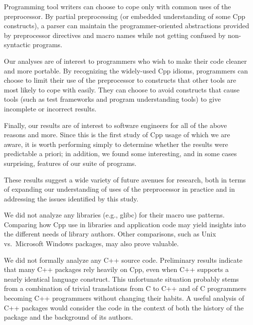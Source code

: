 \documentclass[10pt]{article}
\newcommand{\pkg}[1]{\textsf{#1}}
\begin{document}

Programming tool writers can choose to cope only with common uses of the
preprocessor.  By partial preprocessing (or embedded understanding of
some Cpp constructs), a parser can maintain the
programmer-oriented abstractions provided by preprocessor directives and
macro names while not getting confused by non-syntactic programs.

Our analyses are of interest to programmers who wish to make their code
cleaner and more portable.  By recognizing the widely-used Cpp idioms,
programmers can choose to limit their use of the preprocessor to
constructs that other tools are most likely to cope with easily.  They
can choose to avoid constructs that cause tools (such as test frameworks
and program understanding tools) to give incomplete or incorrect
results.


Finally, our results are of interest to software engineers for all of the
above reasons and more.  Since this is the first study of Cpp usage of
which we are aware, it is worth performing simply to determine whether the
results were predictable a priori; in addition, we found
some interesting, and in some cases surprising, features of our suite of
programs.


 
These results suggest a wide variety of future avenues for research, both
in terms of expanding our understanding of uses of the preprocessor in
practice and in addressing the issues identified by this study.

We did not analyze any libraries (e.g., \pkg{glibc}) for their macro use
patterns.  Comparing how Cpp use in libraries and application code may
yield insights into the different needs of library authors.  Other
comparisons, such as Unix vs.~Microsoft Windows packages, may also prove
valuable.

We did not formally analyze any C++ source code.  Preliminary results
indicate that many C++ packages rely heavily on Cpp, even when C++ supports
a nearly identical language construct.  This unfortunate situation probably
stems from a combination of trivial translations from C to C++ and of C
programmers becoming C++ programmers without changing their habits.  A
useful analysis of C++ packages would consider the code in the context of
both the history of the package and the background of its authors.
\end{document}
